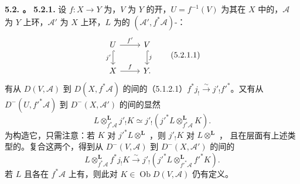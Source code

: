 \textbf{5.2. 。}
\textbf{5.2.1.} 设 $f:X\to Y$ 为，$V$ 为 $Y$ 的开，$U=f^{-1}(V)$ 为其在 $X$ 中的，$\mathscr A$ 为 $Y$ 上环，$\mathscr A'$ 为 $X$ 上环，$L$ 为的 $(\mathscr A',f^*\mathscr A)$-：
\[\begin{tikzcd}U\arrow[r,"f'"]\arrow[d,hook,"j'"']&V\arrow[d,hook,"j"]\\X\arrow[r,"f"]&Y.\end{tikzcd}\tag{5.2.1.1}\]
有从 $D(V,\mathscr A)$ 到 $D(X,f^*\mathscr A)$ 的间的（5.1.2.1）$f^*j_!\xrightarrow{\sim}j'_!f'^*$。又有从 $D^-(U,f'^*\mathscr A)$ 到 $D^-(X,\mathscr A')$ 的间的显然
\[L\otimes^{\mathbf L}_{f^*\mathscr A}j'_!K\simeq j'_!(j'^*L\otimes^{\mathbf L}_{f^*\mathscr A}K).\]
为构造它，只需注意：若 $K$ 对 $j'^*L\otimes^{\mathbf L}$ ，则 $j'_!K$ 对 $L\otimes^{\mathbf L}$ ，
且在层面有上述类型的。复合这两个，得到从 $D^-(V,\mathscr A)$ 到 $D^-(X,\mathscr A')$ 的间的
\[L\otimes^{\mathbf L}_{f^*\mathscr A}f^*j_!K\xrightarrow{\sim}j'_!(j'^*L\otimes^{\mathbf L}_{f'^*\mathscr A}f'^*K).\tag{5.2.1.2}\]
若 $L$ 且各在 $f^*\mathscr A$ 上有，则此对 $K\in\operatorname{Ob}D(V,\mathscr A)$ 仍有定义。

